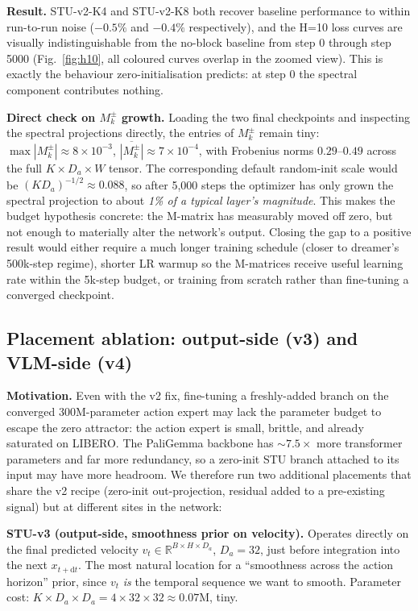 \documentclass[10pt, letterpaper]{article}
\begin{document}
\textbf{Result.} STU-v2-K4 and STU-v2-K8 both recover baseline performance to within run-to-run noise ($-0.5\%$ and $-0.4\%$ respectively), and the H=10 loss curves are visually indistinguishable from the no-block baseline from step 0 through step 5000 (Fig.~\ref{fig:h10}, all coloured curves overlap in the zoomed view). This is exactly the behaviour zero-initialisation predicts: at step 0 the spectral component contributes nothing.

\textbf{Direct check on $M_k^\pm$ growth.} Loading the two final checkpoints and inspecting the spectral projections directly, the entries of $M_k^\pm$ remain tiny: $\max|M^\pm_k| \approx 8 \times 10^{-3}$, $\overline{|M^\pm_k|} \approx 7 \times 10^{-4}$, with Frobenius norms $0.29$--$0.49$ across the full $K \times D_a \times W$ tensor. The corresponding default random-init scale would be $(KD_a)^{-1/2} \approx 0.088$, so after 5{,}000 steps the optimizer has only grown the spectral projection to about \emph{1\% of a typical layer's magnitude}. This makes the budget hypothesis concrete: the M-matrix has measurably moved off zero, but not enough to materially alter the network's output. Closing the gap to a positive result would either require a much longer training schedule (closer to dreamer's 500k-step regime), shorter LR warmup so the M-matrices receive useful learning rate within the 5k-step budget, or training from scratch rather than fine-tuning a converged checkpoint.

\subsection*{Placement ablation: output-side (v3) and VLM-side (v4)}
\label{sec:placement}

\textbf{Motivation.} Even with the v2 fix, fine-tuning a freshly-added branch on the converged 300M-parameter action expert may lack the parameter budget to escape the zero attractor: the action expert is small, brittle, and already saturated on LIBERO. The PaliGemma backbone has $\sim 7.5\times$ more transformer parameters and far more redundancy, so a zero-init STU branch attached to its input may have more headroom. We therefore run two additional placements that share the v2 recipe (zero-init out-projection, residual added to a pre-existing signal) but at different sites in the network:

\textbf{STU-v3 (output-side, smoothness prior on velocity).} Operates directly on the final predicted velocity $v_t \in \mathbb{R}^{B \times H \times D_a}$, $D_a{=}32$, just before integration into the next $x_{t+\mathrm{d}t}$. The most natural location for a ``smoothness across the action horizon'' prior, since $v_t$ \emph{is} the temporal sequence we want to smooth. Parameter cost: $K \times D_a \times D_a = 4 \times 32 \times 32 \approx 0.07\mathrm{M}$, tiny.
\end{document}
